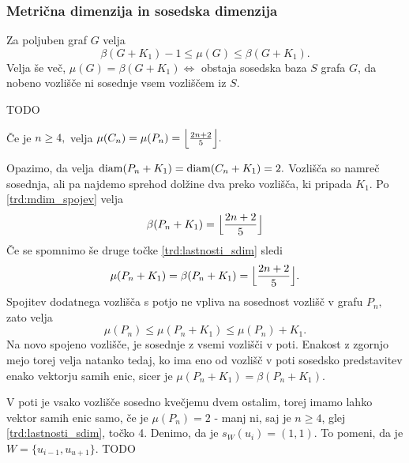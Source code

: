 \documentclass[mat1, tisk]{fmfdelo}
\newcommand{\1}{(1, 1, \ldots, 1)}
\newcommand{\2}{(2, 2, \ldots, 2)}
\begin{document}

\subsubsection{Metrična dimenzija in sosedska dimenzija} \label{ss:mdim_sdim}

\begin{trditev} \label{trd:meja_sdim}
    Za poljuben graf $G$ velja
    $$\beta(G + K_1) - 1 \leq \mu(G) \leq \beta(G + K_1).$$
    Velja še več, 
    $\mu(G) = \beta(G + K_1) \Leftrightarrow$ obstaja sosedska baza $S$ grafa $G$, 
    da nobeno vozlišče ni sosednje vsem vozliščem iz $S$.
\end{trditev}

\begin{dokaz}
    TODO
\end{dokaz}


\begin{trditev} \label{trd:sdim_pot_cikel}
    Če je $n \geq 4,$ velja $\mu(C_n) = \mu(P_n) = \Bigl \lfloor \frac{2n + 2}{5}\Bigr \rfloor. $
\end{trditev}

\begin{dokaz}
    Opazimo, da velja ${\rm diam}(P_n + K_1) = {\rm diam}(C_n + K_1) = 2.$ Vozlišča so namreč sosednja, ali 
    pa najdemo sprehod dolžine dva preko vozlišča, ki pripada $K_1$. Po \ref{trd:mdim_spojev} velja 
    $$\beta(P_n + K_1) = \Bigl \lfloor \frac{2n + 2}{5}\Bigr \rfloor$$
    Če se spomnimo še druge točke \ref{trd:lastnosti_sdim} sledi 
    $$\mu(P_n + K_1) = \beta(P_n + K_1) = \Bigl \lfloor \frac{2n + 2}{5}\Bigr \rfloor.$$
    Spojitev dodatnega vozlišča s potjo ne vpliva na sosednost vozlišč v grafu $P_n,$ zato velja
    $$\mu(P_n) \leq \mu(P_n + K_1) \leq \mu(P_n) + K_1.$$
    Na novo spojeno vozlišče, je sosednje z vsemi vozlišči v poti. Enakost z zgornjo mejo torej velja natanko
    tedaj, ko ima eno od vozlišč v poti sosedsko predstavitev enako vektorju samih enic, sicer je 
    $\mu(P_n + K_1) = \beta(P_n + K_1).$
    
    V poti je vsako vozlišče sosedno kvečjemu dvem ostalim, torej imamo lahko vektor samih enic samo,
    če je $\mu(P_n) = 2$ - manj ni, saj je $n \geq 4$, glej \ref{trd:lastnosti_sdim}, točko 4.
    Denimo, da je $s_W(u_i) = (1, 1).$ To pomeni, da je $W =\{ u_{i-1}, u_{u+1}\}.$  
    TODO
\end{dokaz}
\end{document}
